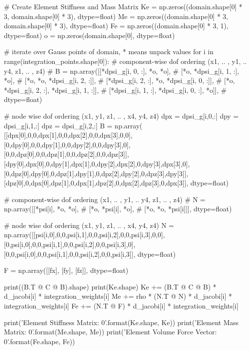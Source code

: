 \documentclass[10pt,b5paper,titlepage]{book}
\begin{document}
\begin{python}
    # Create Element Stiffness and Mass Matrix
    Ke = np.zeros((domain.shape[0] * 3, domain.shape[0] * 3), dtype=float)
    Me = np.zeros((domain.shape[0] * 3, domain.shape[0] * 3), dtype=float)
    Fe = np.zeros((domain.shape[0] * 3, 1), dtype=float)
    o = np.zeros(domain.shape[0], dtype=float)

    # iterate over Gauss points of domain, * means unpack values
    for i in range(integration_points.shape[0]):
        # component-wise dof ordering (x1, .. , y1, .. y4, z1, .. , z4)
        # B = np.array([[*dpsi_g[i, 0, :], *o, *o],
        #               [*o, *dpsi_g[i, 1, :], *o],
        #               [*o, *o, *dpsi_g[i, 2, :]],
        #               [*dpsi_g[i, 2, :], *o, *dpsi_g[i, 0, :]],
        #               [*o, *dpsi_g[i, 2, :], *dpsi_g[i, 1, :]],
        #               [*dpsi_g[i, 1, :], *dpsi_g[i, 0, :], *o]],
        #               dtype=float)

        # node wise dof ordering (x1, y1, z1, .. , x4, y4, z4)
        dpx = dpsi_g[i,0,:]
        dpy = dpsi_g[i,1,:]
        dpz = dpsi_g[i,2,:]
        B = np.array(
            [[dpx[0],0,0,dpx[1],0,0,dpx[2],0,0,dpx[3],0,0],
             [0,dpy[0],0,0,dpy[1],0,0,dpy[2],0,0,dpy[3],0],
             [0,0,dpz[0],0,0,dpz[1],0,0,dpz[2],0,0,dpz[3]],
             [dpy[0],dpx[0],0,dpy[1],dpx[1],0,dpy[2],dpx[2],0,dpy[3],dpx[3],0],
             [0,dpz[0],dpy[0],0,dpz[1],dpy[1],0,dpz[2],dpy[2],0,dpz[3],dpy[3]],
             [dpz[0],0,dpx[0],dpz[1],0,dpx[1],dpz[2],0,dpx[2],dpz[3],0,dpx[3]],
             dtype=float)

        # component-wise dof ordering (x1, .. , y1, .. y4, z1, .. , z4)
        # N = np.array([[*psi[i], *o, *o],
        #               [*o, *psi[i], *o],
        #               [*o, *o, *psi[i]]], dtype=float)

        # node wise dof ordering (x1, y1, z1, .. , x4, y4, z4)
        N = np.array([[psi[i,0],0,0,psi[i,1],0,0,psi[i,2],0,0,psi[i,3],0,0],
                      [0,psi[i,0],0,0,psi[i,1],0,0,psi[i,2],0,0,psi[i,3],0],
                      [0,0,psi[i,0],0,0,psi[i,1],0,0,psi[i,2],0,0,psi[i,3]],
                      dtype=float)

        F = np.array([[fx], [fy], [fz]], dtype=float)

        print((B.T @ C @ B).shape)
        print(Ke.shape)
        Ke += (B.T @ C @ B) * d_jacobi[i] * integration_weights[i]
        Me += rho * (N.T @ N) * d_jacobi[i] * integration_weights[i]
        Fe += (N.T @ F) * d_jacobi[i] * integration_weights[i]

    print('Element Stiffness Matrix: {0}'.format(Ke.shape, Ke))
    print('Element Mass Matrix: {0}'.format(Me.shape, Me))
    print('Element Volume Force Vector: {0}'.format(Fe.shape, Fe))
\end{python}
\end{document}
